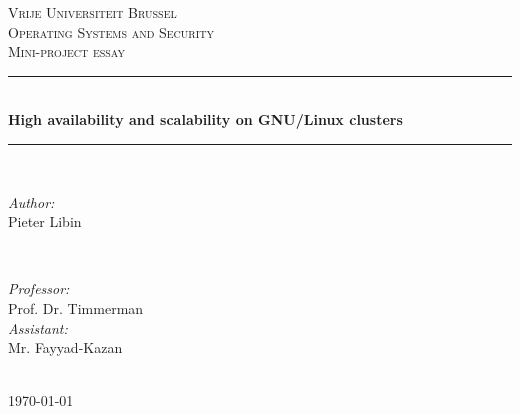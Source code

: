 \documentclass[12pt]{report}
\begin{document}

\begin{titlepage}

\newcommand{\HRule}{\rule{\linewidth}{0.5mm}} %

\center %

\textsc{\LARGE Vrije Universiteit Brussel}\\[1.5cm] 
\textsc{\Large Operating Systems and Security}\\[0.5cm] 
\textsc{\large Mini-project essay}\\[0.5cm] 

\HRule \\[0.4cm]
{ \huge \bfseries High availability and scalability on GNU/Linux clusters}\\[0.4cm] %
\HRule \\[1.5cm]

\begin{minipage}{0.4\textwidth}
\begin{flushleft} \large
\emph{Author:}\\
Pieter Libin %
\end{flushleft}
\end{minipage}
~
\begin{minipage}{0.4\textwidth}
\begin{flushright} \large
\emph{Professor:} \\
Prof. Dr. Timmerman\\
\emph{Assistant:} \\
Mr. Fayyad-Kazan
\end{flushright}
\end{minipage}\\[4cm]

{\large \today}\\[3cm] %


\vfill %

\end{titlepage}
\end{document}
